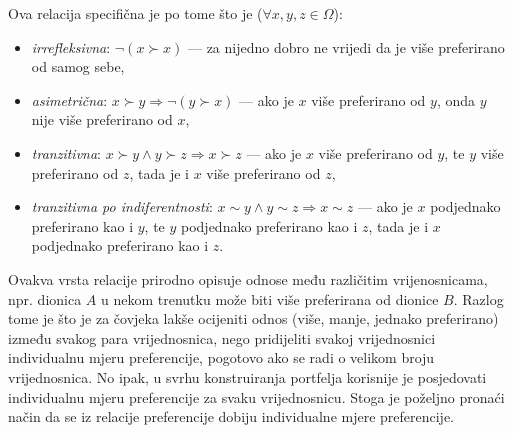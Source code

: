 \documentclass[lmodern, utf8, diplomski, numeric]{fer}
\begin{document}
  Ova relacija specifična je po tome što je ($\forall x, y, z \in \Omega$):
  \begin{itemize}
    \item \textit{irrefleksivna}: $\neg \left( x \succ x \right)$ --- za nijedno dobro ne vrijedi da je više preferirano od samog sebe,
    \item \textit{asimetrična}: $x \succ y \Rightarrow \neg \left( y \succ x \right)$ --- ako je $x$ više preferirano od $y$, onda $y$ nije više preferirano od $x$,
    \item \textit{tranzitivna}: $x \succ y \wedge y \succ z \Rightarrow x \succ z$ --- ako je $x$ više preferirano od $y$, te $y$ više preferirano od $z$, tada je i $x$ više preferirano od $z$,
    \item \textit{tranzitivna po indiferentnosti}: $x \sim y \wedge y \sim z \Rightarrow x \sim z$ --- ako je $x$ podjednako preferirano kao i $y$, te $y$ podjednako preferirano kao i $z$, tada je i $x$ podjednako preferirano kao i $z$.
  \end{itemize}
  
  Ovakva vrsta relacije prirodno opisuje odnose među različitim vrijenosnicama, npr. dionica $A$ u nekom trenutku može biti više preferirana od dionice $B$.
  Razlog tome je što je za čovjeka lakše ocijeniti odnos (više, manje, jednako preferirano) između svakog para vrijednosnica, nego pridijeliti svakoj vrijednosnici individualnu mjeru preferencije, pogotovo ako se radi o velikom broju vrijednosnica.
  No ipak, u svrhu konstruiranja portfelja korisnije je posjedovati individualnu mjeru preferencije za svaku vrijednosnicu.
  Stoga je poželjno pronaći način da se iz relacije preferencije dobiju individualne mjere preferencije.
  
\end{document}
